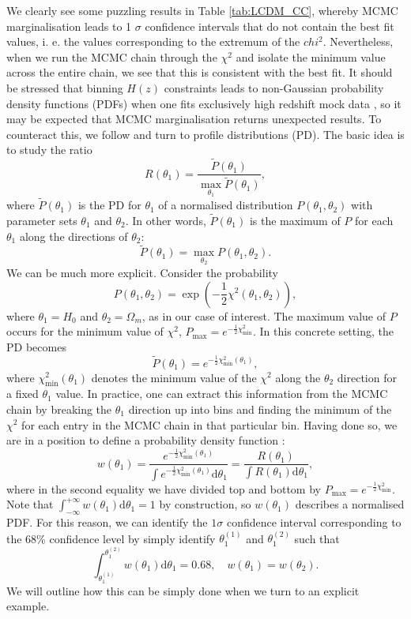 \documentclass[aps,prl,10pt,twocolumn,superscriptaddress, nofootinbib]{revtex4}
\def\be{\begin{equation}}
\def\ee{\end{equation}}
\newcommand{\dd}{\textrm{d}}
\begin{document}
We clearly see some puzzling results in Table \ref{tab:LCDM_CC}, whereby MCMC marginalisation leads to 1 $\sigma$ confidence intervals that do not contain the best fit values, i. e. the values corresponding to the extremum of the $chi^2$. Nevertheless, when we run the MCMC chain through the $\chi^2$ and isolate the minimum value across the entire chain, we see that this is consistent with the best fit. It should be stressed that binning $H(z)$ constraints leads to non-Gaussian probability density functions (PDFs) when one fits exclusively high redshift mock data \cite{Colgain:2022tql}, so it may be expected that MCMC marginalisation returns unexpected results. To counteract this, we follow \cite{Gomez-Valent:2022hkb} and turn to profile distributions (PD). The basic idea is to study the ratio 
\be
R(\theta_1) = \frac{\tilde{P}(\theta_1)}{\max_{\theta_1} \tilde{P}(\theta_1) },  
\ee
where $\tilde{P}(\theta_1)$ is the PD for $\theta_1$ of a normalised distribution $P(\theta_1, \theta_2)$ with parameter sets $\theta_1$ and $\theta_2$. In other words, $\tilde{P}(\theta_1)$ is the maximum of $P$ for each $\theta_1$ along the directions of $\theta_2$: 
\be
\label{PD}
\tilde{P} (\theta_1) = \max_{\theta_2} P(\theta_1, \theta_2). 
\ee
We can be much more explicit. Consider the probability 
\be
P(\theta_1, \theta_2) = \exp \left( - \frac{1}{2} \chi^2(\theta_1, \theta_2) \right), 
\ee
where $\theta_1 = H_0$ and $\theta_2 = \Omega_m$, as in our case of interest. The maximum value of $P$ occurs for the minimum value of $\chi^2$, $P_{\textrm{max}} = e^{-\frac{1}{2} \chi^2_{\textrm{min}}}$. In this concrete setting, the PD becomes 
\be
\tilde{P}(\theta_1) = e^{-\frac{1}{2} \chi^2_{\textrm{min}}(\theta_1)}, 
\ee
where $\chi^2_{\textrm{min}}(\theta_1)$ denotes the minimum value of the $\chi^2$ along the $\theta_2$ direction for a fixed $\theta_1$ value. In practice, one can extract this information from the MCMC chain by breaking the $\theta_1$ direction up into bins and finding the minimum of the $\chi^2$ for each entry in the MCMC chain in that particular bin. Having done so, we are in a position to define a probability density function \cite{Gomez-Valent:2022hkb}: 
\be
\label{w}
w(\theta_1) = \frac{e^{-\frac{1}{2} \chi^2_{\textrm{min}}(\theta_1)}}{\int e^{-\frac{1}{2} \chi^2_{\textrm{min}}(\theta_1)} \dd \theta_1} = \frac{R(\theta_1)}{\int R(\theta_1) \dd \theta_1}, 
\ee
where in the second equality we have divided top and bottom by $P_{\textrm{max}} = e^{-\frac{1}{2} \chi^2_{\textrm{min}}}$. Note that $\int_{-\infty}^{+\infty} w(\theta_1) \dd \theta_1 = 1$ by construction, so $w(\theta_1)$ describes a normalised PDF. For this reason, we can identify the $1 \sigma$ confidence interval corresponding to the 68\% confidence level by simply identify $\theta_1^{(1)}$ and $\theta_1^{(2)}$ such that \cite{Gomez-Valent:2022hkb}
\be
\label{w1sigma}
\int_{\theta_1^{(1)}}^{\theta_1^{(2)}} w(\theta_1) \dd \theta_1 = 0.68, \quad w(\theta_1) = w(\theta_2). 
\ee
We will outline how this can be simply done when we turn to an explicit example. 
\end{document}
